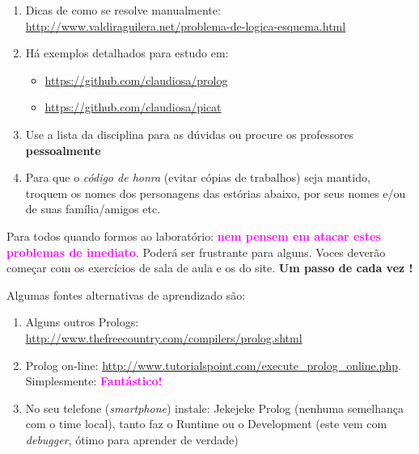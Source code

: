 \documentclass[a4paper,12pt]{article}
\begin{document}
\begin{enumerate}
\setlength\itemsep{0.1cm}
\item Dicas de como se resolve manualmente:\\
\url{http://www.valdiraguilera.net/problema-de-logica-esquema.html}

\item Há exemplos detalhados para estudo em:
\begin{itemize}
  \item  \url{https://github.com/claudiosa/prolog} 
  \item  \url{https://github.com/claudiosa/picat}
\end{itemize}



\item Use a lista da disciplina para as dúvidas ou procure os professores \textbf{pessoalmente}

\item Para que o \textit{código de honra} (evitar cópias de trabalhos) seja mantido, troquem os nomes dos personagens das estórias abaixo, por seus nomes e/ou de suas família/amigos etc. 

\end{enumerate}

\newpage

\begin{center}

\vskip 2cm
{\Large
Para todos quando formos ao laboratório: \textbf{\textcolor{magenta}{nem pensem em atacar estes problemas de imediato}}. Poderá ser frustrante para alguns. Voces deverão começar com os exercícios de sala de aula e os do site. \textbf{Um passo de cada vez !}
}
\vskip 2cm
\end{center}

Algumas fontes alternativas de aprendizado s\~ao:

\begin{enumerate}


\item Alguns outros Prologs:  \url{http://www.thefreecountry.com/compilers/prolog.shtml}

\item Prolog on-line: \url{http://www.tutorialspoint.com/execute_prolog_online.php}. Simplesmente: \textbf{\textcolor{magenta}{Fantástico!}}

 \item No seu telefone (\emph{smartphone}) instale: Jekejeke Prolog (nenhuma semelhança com o time local), tanto faz o Runtime ou o Development (este vem com 
 \emph{debugger}, ótimo para aprender de verdade)

\end{enumerate}
\end{document}
